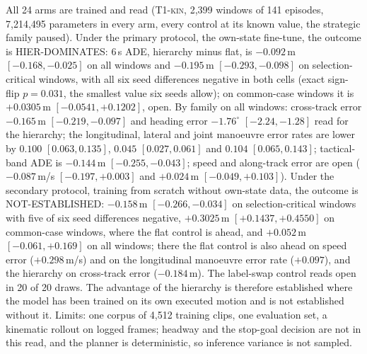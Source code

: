 \documentclass[10pt,twocolumn]{article}
\makeatletter
\theoremstyle{remark}
\newcommand{\tier}[1]{\textsc{\small #1}}
\renewcommand\paragraph{\@startsection{paragraph}{4}{\z@}{1.6ex \@plus .5ex \@minus .2ex}{-1em}{\normalfont\normalsize\bfseries}}
\makeatother
\begin{document}
\paragraph{The six-seed replicate.} All 24 arms are trained and read (\tier{T1-kin}, 2,399 windows of 141 episodes, 7,214,495 parameters in
every arm, every control at its known value, the strategic family paused). Under the primary protocol, the own-state fine-tune, the
outcome is HIER-DOMINATES: 6\,s ADE, hierarchy minus flat, is $-0.092$\,m $[-0.168,-0.025]$ on all windows and $-0.195$\,m
$[-0.293,-0.098]$ on selection-critical windows, with all six seed differences negative in both cells (exact sign-flip $p=0.031$, the
smallest value six seeds allow); on common-case windows it is $+0.0305$\,m $[-0.0541,+0.1202]$, open. By family on all windows:
cross-track error $-0.165$\,m $[-0.219,-0.097]$ and heading error $-1.76^\circ$ $[-2.24,-1.28]$ read for the hierarchy; the
longitudinal, lateral and joint manoeuvre error rates are lower by $0.100$ $[0.063,0.135]$, $0.045$ $[0.027,0.061]$ and $0.104$
$[0.065,0.143]$; tactical-band ADE is $-0.144$\,m $[-0.255,-0.043]$; speed and along-track error are open ($-0.087$\,m/s
$[-0.197,+0.003]$ and $+0.024$\,m $[-0.049,+0.103]$). Under the secondary protocol, training from scratch without own-state data, the
outcome is NOT-ESTABLISHED: $-0.158$\,m $[-0.266,-0.034]$ on selection-critical windows with five of six seed differences negative,
$+0.3025$\,m $[+0.1437,+0.4550]$ on common-case windows, where the flat control is ahead, and $+0.052$\,m $[-0.061,+0.169]$ on all
windows; there the flat control is also ahead on speed error ($+0.298$\,m/s) and on the longitudinal manoeuvre error rate ($+0.097$),
and the hierarchy on cross-track error ($-0.184$\,m). The label-swap control reads open in 20 of 20 draws. The advantage of the
hierarchy is therefore established where the model has been trained on its own executed motion and is not established without it.
Limits: one corpus of 4,512 training clips, one evaluation set, a kinematic rollout on logged frames; headway and the stop-goal
decision are not in this read, and the planner is deterministic, so inference variance is not sampled.
\end{document}
